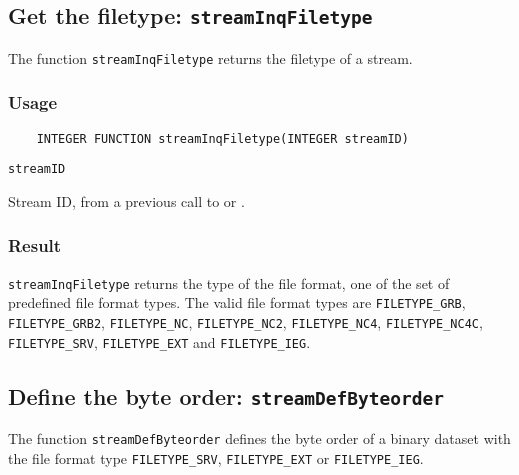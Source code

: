 \subsection{Get the filetype: {\tt streamInqFiletype}}
\label{streamInqFiletype}

The function {\tt streamInqFiletype} returns the filetype of a stream.

\subsubsection*{Usage}

\begin{verbatim}
    INTEGER FUNCTION streamInqFiletype(INTEGER streamID)
\end{verbatim}

\hspace*{4mm}\begin{minipage}[]{15cm}
\begin{deflist}{\tt streamID\ }
\item[{\tt streamID}]
Stream ID, from a previous call to {} or {}.

\end{deflist}
\end{minipage}

\subsubsection*{Result}

{\tt streamInqFiletype} returns the type of the file format,
one of the set of predefined {\CDI} file format types.
The valid {\CDI} file format types are {\tt FILETYPE\_GRB}, {\tt FILETYPE\_GRB2}, {\tt FILETYPE\_NC}, {\tt FILETYPE\_NC2},
{\tt FILETYPE\_NC4}, {\tt FILETYPE\_NC4C}, {\tt FILETYPE\_SRV}, {\tt FILETYPE\_EXT} and {\tt FILETYPE\_IEG}.



\subsection{Define the byte order: {\tt streamDefByteorder}}
\label{streamDefByteorder}

The function {\tt streamDefByteorder} defines the byte order of a binary dataset
with the file format type {\tt FILETYPE\_SRV}, {\tt FILETYPE\_EXT} or {\tt FILETYPE\_IEG}.

